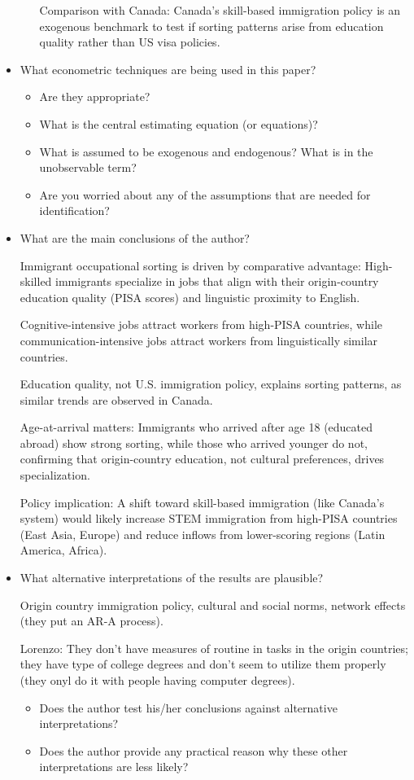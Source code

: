 \documentclass{article}
\begin{document}
\begin{itemize}
\begin{itemize}
        Comparison with Canada: Canada's skill-based immigration policy is an exogenous benchmark to test if sorting patterns arise from education quality rather than US visa policies.

    \end{itemize}
    \item What econometric techniques are being used in this paper?
    \begin{itemize}
        \item Are they appropriate?
        \item What is the central estimating equation (or equations)?
        \item What is assumed to be exogenous and endogenous? What is in the unobservable term?
        \item Are you worried about any of the assumptions that are needed for identification?
    \end{itemize}
    \item What are the main conclusions of the author?
    
    Immigrant occupational sorting is driven by comparative advantage: High-skilled immigrants specialize in jobs that align with their origin-country education quality (PISA scores) and linguistic proximity to English.

    Cognitive-intensive jobs attract workers from high-PISA countries, while communication-intensive jobs attract workers from linguistically similar countries.

    Education quality, not U.S. immigration policy, explains sorting patterns, as similar trends are observed in Canada.

    Age-at-arrival matters: Immigrants who arrived after age 18 (educated abroad) show strong sorting, while those who arrived younger do not, confirming that origin-country education, not cultural preferences, drives specialization.

    Policy implication: A shift toward skill-based immigration (like Canada's system) would likely increase STEM immigration from high-PISA countries (East Asia, Europe) and reduce inflows from lower-scoring regions (Latin America, Africa).

    \item What alternative interpretations of the results are plausible?
    
    Origin country immigration policy, cultural and social norms, network effects (they put an AR-A process).

    Lorenzo: They don't have measures of routine in tasks in the origin countries; they have type of college degrees and don't seem to utilize them properly (they onyl do it with people having computer degrees).

    \begin{itemize}
        \item Does the author test his/her conclusions against alternative interpretations?
        \item Does the author provide any practical reason why these other interpretations are less likely?
    \end{itemize}
\end{itemize}
\end{document}

